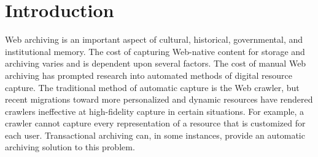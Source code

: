 \documentclass[runningheads,a4paper]{llncs}
\begin{document}

\section{Introduction}
\label{intro}
\vskip -3mm
Web archiving is an important aspect of cultural, historical, governmental, and institutional memory. The cost of capturing Web-native content for storage and archiving varies and is dependent upon several factors. The cost of manual Web archiving has prompted research into automated methods of digital resource capture. The traditional method of automatic capture is the Web crawler, but recent migrations toward more personalized and dynamic resources have rendered crawlers ineffective at high-fidelity capture in certain situations. For example, a crawler cannot capture every representation of a resource that is customized for each user. Transactional archiving can, in some instances, provide an automatic archiving solution to this problem.
\end{document}
